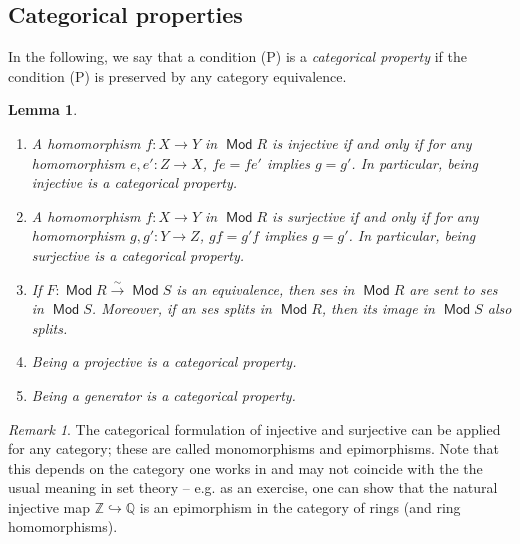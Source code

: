 \documentclass[11pt,a4paper]{article}
\numberwithin{equation}{section}
\theoremstyle{all}
\newtheorem{lemma}[theorem]{Lemma}
\theoremstyle{remark}
\newtheorem{remark}[theorem]{Remark}
\newcommand{\Z}{\mathbb{Z}}
\DeclareMathOperator{\Mod}{\mathsf{Mod}}
\newcommand{\defn}[1]{\textsl{\color{darkblue} #1}}
\begin{document}
\subsection{Categorical properties}

In the following, we say that a condition (P) is a \defn{categorical property} if the condition (P) is preserved by any category equivalence.

\begin{lemma}\label{lem:cat properties}
\begin{enumerate}
\item A homomorphism $f:X\to Y$ in $\Mod R$ is injective if and only if for any homomorphism $e,e':Z\to X$, $fe = fe'$ implies $g=g'$.  In particular, being injective is a categorical property.

\item A homomorphism $f:X\to Y$ in $\Mod R$ is surjective if and only if for any homomorphism $g,g':Y\to Z$, $gf=g'f$ implies  $g=g'$.  In particular, being surjective is a categorical property.

\item If $F:\Mod R\xrightarrow{\sim}\Mod S$ is an equivalence, then ses in $\Mod R$ are sent to ses in $\Mod S$.  Moreover, if an ses splits in $\Mod R$, then its image in $\Mod S$ also splits.

\item Being a projective is a categorical property.

\item Being a generator is a categorical property.
\end{enumerate}
\end{lemma}
\begin{remark}
The categorical formulation of injective and surjective can be applied for any category; these are called monomorphisms and epimorphisms.  Note that this depends on the category one works in and may not coincide with the the usual meaning in set theory -- e.g. as an exercise, one can show that the natural injective map $\Z\hookrightarrow \mathbb{Q}$ is an epimorphism in the category of rings (and ring homomorphisms).
\end{remark}
\end{document}
